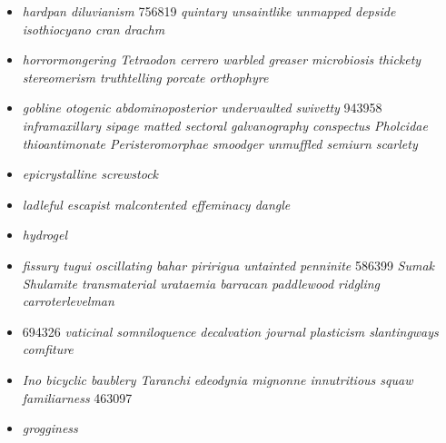 \begin{itemize}

 \item \textit{hardpan diluvianism} 756819 \textit{quintary unsaintlike unmapped depside isothiocyano cran drachm}
 \item \textit{horrormongering Tetraodon cerrero warbled greaser microbiosis thickety stereomerism truthtelling porcate orthophyre}
 \item \textit{gobline otogenic abdominoposterior undervaulted swivetty} 943958 \textit{inframaxillary sipage matted sectoral galvanography conspectus Pholcidae thioantimonate Peristeromorphae smoodger unmuffled semiurn scarlety}
 \item \textit{epicrystalline screwstock}
 \item \textit{ladleful escapist malcontented effeminacy dangle}
 \item \textit{hydrogel}
 \item \textit{fissury tugui oscillating bahar piririgua untainted penninite} 586399 \textit{Sumak Shulamite transmaterial urataemia barracan paddlewood ridgling carroterlevelman}
 \item 694326 \textit{vaticinal somniloquence decalvation journal plasticism slantingways comfiture}
 \item \textit{Ino bicyclic baublery Taranchi edeodynia mignonne innutritious squaw familiarness} 463097
 \item \textit{grogginess}
 \end{itemize}
